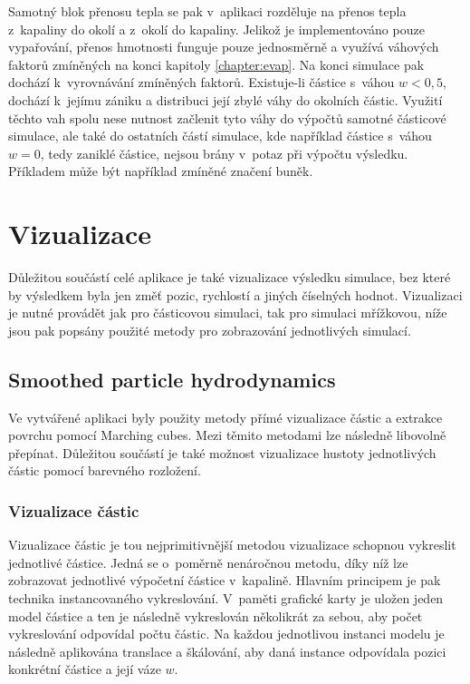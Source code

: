 Samotný blok přenosu tepla se pak v~aplikaci rozděluje na přenos tepla z~kapaliny do okolí a z~okolí do kapaliny. Jelikož je implementováno pouze vypařování, přenos hmotnosti funguje pouze jednosměrně a využívá váhových faktorů zmíněných na konci kapitoly \ref{chapter:evap}. Na konci simulace pak dochází k~vyrovnávání zmíněných faktorů. Existuje-li částice s~váhou $w < 0,5$, dochází k~jejímu zániku a distribuci její zbylé váhy do okolních částic. Využití těchto vah spolu nese nutnost začlenit tyto váhy do výpočtů samotné částicové simulace, ale také do ostatních částí simulace, kde například částice s~váhou $w = 0$, tedy zaniklé částice, nejsou brány v~potaz při výpočtu výsledku. Příkladem může být například zmíněné značení buněk.

\section{Vizualizace}
\label{chapter:Vizualizace}
Důležitou součástí celé aplikace je také vizualizace výsledku simulace, bez které by výsledkem byla jen změť pozic, rychlostí a jiných číselných hodnot. Vizualizaci je nutné provádět jak pro částicovou simulaci, tak pro simulaci mřížkovou, níže jsou pak popsány použité metody pro zobrazování jednotlivých simulací.

\subsection{Smoothed particle hydrodynamics}
\label{chapter:vizSPH}
Ve vytvářené aplikaci byly použity metody přímé vizualizace částic a extrakce povrchu pomocí Marching cubes. Mezi těmito metodami lze následně libovolně přepínat. Důležitou součástí je také možnost vizualizace hustoty jednotlivých částic pomocí barevného rozložení.

\subsubsection{Vizualizace částic}
Vizualizace částic je tou nejprimitivnější metodou vizualizace schopnou vykreslit jednotlivé částice. Jedná se o~poměrně nenáročnou metodu, díky níž lze zobrazovat jednotlivé výpočetní částice v~kapalině. Hlavním principem je pak technika instancovaného vykreslování. V~paměti grafické karty je uložen jeden model částice a ten je následně vykreslován několikrát za sebou, aby počet vykreslování odpovídal počtu částic. Na každou jednotlivou instanci modelu je následně aplikována translace a škálování, aby daná instance odpovídala pozici konkrétní částice a její váze $w$.

